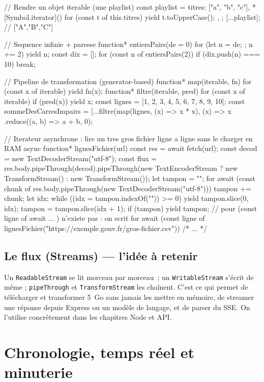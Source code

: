 \documentclass[12pt,a4paper,twoside,openright]{book}
\begin{document}
\begin{codejs}
// Rendre un objet iterable (une playlist)
const playlist = {
  titres: ["a", "b", "c"],
  *[Symbol.iterator]() { for (const t of this.titres) yield t.toUpperCase(); },
};
[...playlist];                    // ["A","B","C"]

// Sequence infinie + paresse
function* entiersPairs(de = 0) { for (let n = de; ; n += 2) yield n; }
const dix = [];
for (const n of entiersPairs(2)) { if (dix.push(n) === 10) break; }

// Pipeline de transformation (generator-based)
function* map(iterable, fn) { for (const x of iterable) yield fn(x); }
function* filtre(iterable, pred) { for (const x of iterable) if (pred(x)) yield x; }
const lignes = [1, 2, 3, 4, 5, 6, 7, 8, 9, 10];
const sommeDesCarresImpairs = [...filtre(map(lignes, (x) => x * x), (x) => x %
  .reduce((a, b) => a + b, 0);

// Iterateur asynchrone : lire un tres gros fichier ligne a ligne sans le charger en RAM
async function* lignesFichier(url) {
  const res = await fetch(url);
  const decod = new TextDecoderStream("utf-8");
  const flux = res.body.pipeThrough(decod).pipeThrough(new TextEncoderStream ? new TransformStream() : new TransformStream());
  let tampon = "";
  for await (const chunk of res.body.pipeThrough(new TextDecoderStream("utf-8"))) {
    tampon += chunk;
    let idx;
    while ((idx = tampon.indexOf("\n")) >= 0) { yield tampon.slice(0, idx); tampon = tampon.slice(idx + 1); }
  }
  if (tampon) yield tampon;
}
// pour (const ligne of await ... ) n'existe pas : on ecrit
for await (const ligne of lignesFichier("https://exemple.gouv.fr/gros-fichier.csv")) { /* ... */ }
\end{codejs}

\subsection{Le flux (Streams) --- l'id\'ee \`a retenir}

Un \verb|ReadableStream| se lit morceau par morceau~; un \verb|WritableStream| s'\'ecrit de m\^eme ;
\verb|pipeThrough| et \verb|TransformStream| les cha\^inent. C'est ce qui permet de
t\'el\'echarger et transformer 5~Go sans jamais les mettre en m\'emoire, de streamer une r\'eponse
depuis Express ou un mod\`ele de langage, et de parser du SSE. On l'utilise concr\`etement dans
les chapitres Node et API.

\section{Chronologie, temps r\'eel et minuterie}
\end{document}
